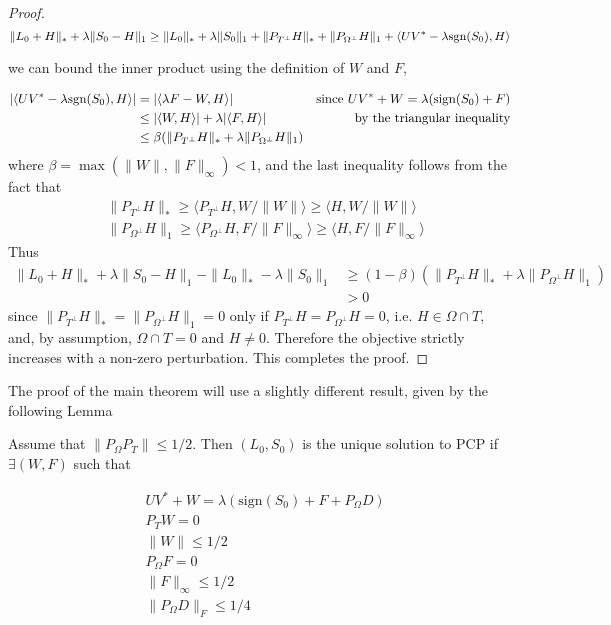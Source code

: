 \begin{proof}
\[
\|L_0 + H\|_* + \lambda \|S_0 - H\|_1 \geq \|L_0\|_* + \lambda \|S_0\|_1  + \|P_{T^\perp} H\|_* + \|P_{\Omega^\perp} H\|_1 + \langle UV^* - \lambda  \text{sgn}(S_0), H\rangle
\]

we can bound the inner product using the definition of $W$ and $F$,

\begin{align*}
|\langle UV^* - \lambda  \text{sgn}(S_0), H\rangle|
& = |\langle \lambda F - W, H\rangle|  & \text{since } UV^* + W = \lambda(\text{sign}(S_0) + F) \\
&\leq |\langle W, H \rangle| + \lambda |\langle F, H \rangle| & \text{by the triangular inequality} \\
&\leq \beta (\|P_{T^\perp} H\|_* + \lambda \|P_{\Omega^\perp} H\|_1)
\end{align*}
where $\beta = \max (\|W\|, \|F\|_\infty) < 1$, and the last inequality follows from the fact that
\[
\begin{aligned}
& \|P_{T^\perp} H\|_* \geq \langle P_{T^\perp} H, W/\|W\| \rangle \geq \langle H, W/\|W\| \rangle\\
& \|P_{\Omega^\perp} H\|_1 \geq \langle P_{\Omega^\perp} H, F/\|F\|_\infty \rangle \geq \langle H, F/\|F\|_\infty \rangle
\end{aligned}
\]
Thus
\begin{align*}
\|L_0 + H\|_* + \lambda \|S_0 - H\|_1 - \|L_0\|_* - \lambda \|S_0 \|_1
&\geq  (1-\beta) \left( \|P_{T^\perp} H\|_* + \lambda \|P_{\Omega^\perp} H\|_1 \right) \\
& > 0
\end{align*}
since $\|P_{T^\perp} H\|_* = \|P_{\Omega^\perp} H\|_1 = 0$ only if $P_{T^\perp} H = P_{\Omega^\perp} H = 0$, i.e. $H \in \Omega \cap T$, and, by assumption, $\Omega \cap T = {0}$ and $H \neq 0$. Therefore the objective strictly increases with a non-zero perturbation. This completes the proof.

\end{proof}


The proof of the main theorem will use a slightly different result, given by the following Lemma
\begin{lemma}
\label{lem:dual_cert}
Assume that $\|P_\Omega P_T \| \leq 1/2$. Then $(L_0,S_0)$ is the unique solution to PCP if $\exists (W, F)$ such that

\begin{equation}
\label{eq:dual_cert_cond}
\begin{aligned}
& UV^* + W = \lambda(\text{sign}(S_0) + F + P_\Omega D) \\
& P_T W = 0 \\
& \|W\| \leq 1/2 \\
& P_\Omega F = 0 \\
& \|F\|_\infty \leq 1/2 \\
&\|P_\Omega D \|_F \leq 1/4
\end{aligned}
\end{equation}

\end{lemma}

